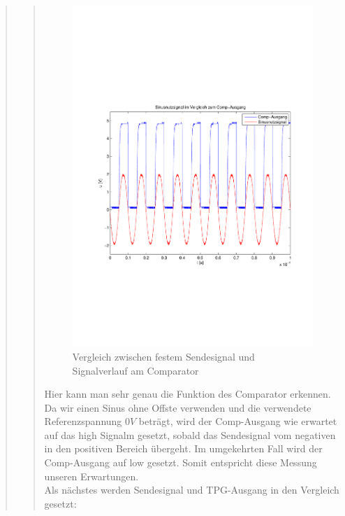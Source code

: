 \begin{quote}
\begin{quote}
            
             \begin{figure}[H] \centering
                    \includegraphics[scale=0.5, trim = 2cm 6.5cm 1.5cm 8.5cm,
                    clip]{./Bilder/sin_vs_comp}
                        \caption{Vergleich zwischen festem Sendesignal und
                        Signalverlauf am Comparator}
                \end{figure}
            
           Hier kann man sehr genau die Funktion des Comparator erkennen. Da wir
           einen Sinus ohne Offste verwenden und die verwendete Referenzspannung
           $0V$ beträgt, wird der Comp-Ausgang wie erwartet auf das high Signalm 
           gesetzt, sobald das Sendesignal vom negativen in den positiven
           Bereich übergeht. Im umgekehrten Fall wird der Comp-Ausgang auf low
           gesetzt. Somit entspricht diese Messung unseren Erwartungen.\\
           Als nächstes werden Sendesignal und TPG-Ausgang in den Vergleich
           gesetzt:
             

\end{quote}
\end{quote}
